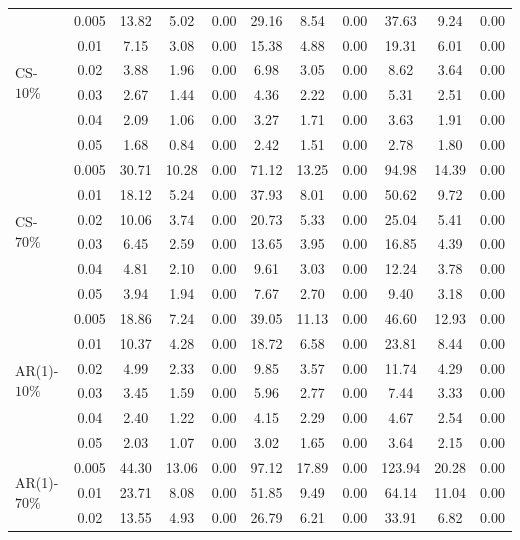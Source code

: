 \documentclass[11pt,a5paper,twoside]{book}
\begin{document}
{{\begin{table}[ht]
{\begin{tabular}{lcccccccccc}
  \hline
\multirow{6}{*}{CS-$10\%$}  &0.005 & 13.82 & 5.02 & 0.00 & 29.16 & 8.54 & 0.00 & 37.63 & 9.24 & 0.00 \\ 
  &0.01 & 7.15 & 3.08 & 0.00 & 15.38 & 4.88 & 0.00 & 19.31 & 6.01 & 0.00 \\ 
  &0.02 & 3.88 & 1.96 & 0.00 & 6.98 & 3.05 & 0.00 & 8.62 & 3.64 & 0.00 \\ 
  &0.03 & 2.67 & 1.44 & 0.00 & 4.36 & 2.22 & 0.00 & 5.31 & 2.51 & 0.00 \\ 
  &0.04 & 2.09 & 1.06 & 0.00 & 3.27 & 1.71 & 0.00 & 3.63 & 1.91 & 0.00 \\ 
  &0.05 & 1.68 & 0.84 & 0.00 & 2.42 & 1.51 & 0.00 & 2.78 & 1.80 & 0.00 \\ \hline
\multirow{6}{*}{CS-$70\%$}   &0.005 & 30.71 & 10.28 & 0.00 & 71.12 & 13.25 & 0.00 & 94.98 & 14.39 & 0.00 \\ 
  &0.01 & 18.12 & 5.24 & 0.00 & 37.93 & 8.01 & 0.00 & 50.62 & 9.72 & 0.00 \\ 
  &0.02 & 10.06 & 3.74 & 0.00 & 20.73 & 5.33 & 0.00 & 25.04 & 5.41 & 0.00 \\ 
  &0.03 & 6.45 & 2.59 & 0.00 & 13.65 & 3.95 & 0.00 & 16.85 & 4.39 & 0.00 \\ 
  &0.04 & 4.81 & 2.10 & 0.00 & 9.61 & 3.03 & 0.00 & 12.24 & 3.78 & 0.00 \\ 
  &0.05 & 3.94 & 1.94 & 0.00 & 7.67 & 2.70 & 0.00 & 9.40 & 3.18 & 0.00 \\ \hline
\multirow{6}{*}{AR(1)-$10\%$}  &0.005 & 18.86 & 7.24 & 0.00 & 39.05 & 11.13 & 0.00 & 46.60 & 12.93 & 0.00 \\ 
  &0.01 & 10.37 & 4.28 & 0.00 & 18.72 & 6.58 & 0.00 & 23.81 & 8.44 & 0.00 \\ 
  &0.02 & 4.99 & 2.33 & 0.00 & 9.85 & 3.57 & 0.00 & 11.74 & 4.29 & 0.00 \\ 
  &0.03 & 3.45 & 1.59 & 0.00 & 5.96 & 2.77 & 0.00 & 7.44 & 3.33 & 0.00 \\ 
  &0.04 & 2.40 & 1.22 & 0.00 & 4.15 & 2.29 & 0.00 & 4.67 & 2.54 & 0.00 \\ 
  &0.05 & 2.03 & 1.07 & 0.00 & 3.02 & 1.65 & 0.00 & 3.64 & 2.15 & 0.00 \\ \hline
\multirow{6}{*}{AR(1)-$70\%$}  &0.005 & 44.30 & 13.06 & 0.00 & 97.12 & 17.89 & 0.00 & 123.94 & 20.28 & 0.00 \\ 
  &0.01 & 23.71 & 8.08 & 0.00 & 51.85 & 9.49 & 0.00 & 64.14 & 11.04 & 0.00 \\ 
  &0.02 & 13.55 & 4.93 & 0.00 & 26.79 & 6.21 & 0.00 & 33.91 & 6.82 & 0.00 \\ 

\end{tabular}}
\end{table}}}
\end{document}
